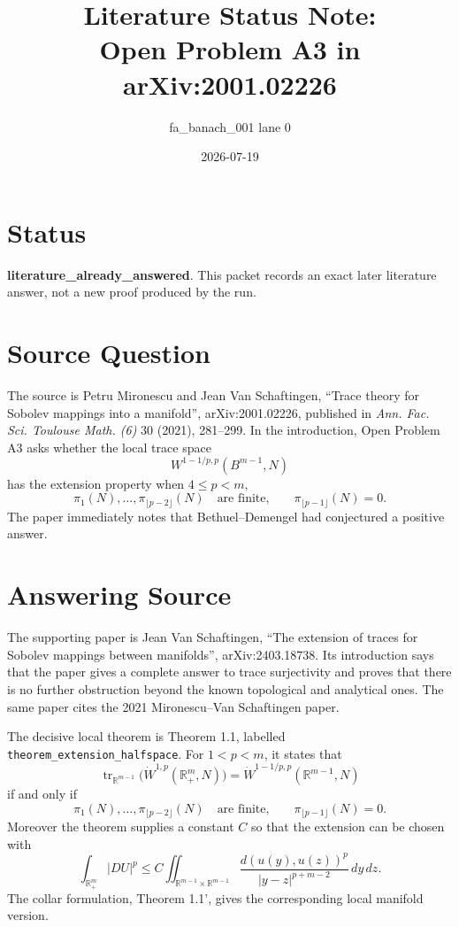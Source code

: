 \documentclass[11pt]{article}
\title{Literature Status Note:\\Open Problem A3 in arXiv:2001.02226}
\author{fa\_banach\_001 lane 0}
\date{2026-07-19}
\begin{document}
\maketitle

\section*{Status}

\textbf{literature\_already\_answered}.  This packet records an exact later
literature answer, not a new proof produced by the run.

\section*{Source Question}

The source is Petru Mironescu and Jean Van Schaftingen,
``Trace theory for Sobolev mappings into a manifold'', arXiv:2001.02226,
published in \emph{Ann. Fac. Sci. Toulouse Math. (6)} 30 (2021), 281--299.
In the introduction, Open Problem A3 asks whether the local trace space
\[
  W^{1-1/p,p}(B^{m-1},N)
\]
has the extension property when \(4 \le p < m\),
\[
  \pi_1(N),\ldots,\pi_{\lfloor p-2\rfloor}(N)
  \quad\text{are finite,}
  \qquad
  \pi_{\lfloor p-1\rfloor}(N)=0.
\]
The paper immediately notes that Bethuel--Demengel had conjectured a positive
answer.

\section*{Answering Source}

The supporting paper is Jean Van Schaftingen, ``The extension of traces for
Sobolev mappings between manifolds'', arXiv:2403.18738.  Its introduction says
that the paper gives a complete answer to trace surjectivity and proves that
there is no further obstruction beyond the known topological and analytical
ones.  The same paper cites the 2021 Mironescu--Van Schaftingen paper.

The decisive local theorem is Theorem 1.1, labelled
\texttt{theorem\_extension\_halfspace}.  For \(1<p<m\), it states that
\[
  \operatorname{tr}_{\mathbb R^{m-1}}
  \bigl(\dot W^{1,p}(\mathbb R^m_+,N)\bigr)
  =
  \dot W^{1-1/p,p}(\mathbb R^{m-1},N)
\]
if and only if
\[
  \pi_1(N),\ldots,\pi_{\lfloor p-2\rfloor}(N)
  \quad\text{are finite,}
  \qquad
  \pi_{\lfloor p-1\rfloor}(N)=0.
\]
Moreover the theorem supplies a constant \(C\) so that the extension can be
chosen with
\[
  \int_{\mathbb R^m_+} |DU|^p
  \le
  C \iint_{\mathbb R^{m-1}\times\mathbb R^{m-1}}
  \frac{d(u(y),u(z))^p}{|y-z|^{p+m-2}}\,dy\,dz .
\]
The collar formulation, Theorem 1.1', gives the corresponding local manifold
version.
\end{document}
